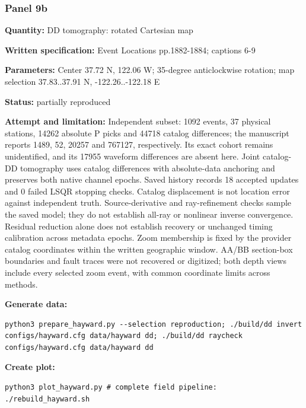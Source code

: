 \subsubsection*{Panel 9b}
\noindent\textbf{Quantity:} DD tomography: rotated Cartesian map\par
\noindent\textbf{Written specification:} Event Locations pp.1882-1884; captions 6-9\par
\noindent\textbf{Parameters:} Center 37.72 N, 122.06 W; 35-degree anticlockwise rotation; map selection 37.83..37.91 N, -122.26..-122.18 E\par
\noindent\textbf{Status:} partially reproduced\par
\noindent\textbf{Attempt and limitation:} Independent subset: 1092 events, 37 physical stations, 14262 absolute P picks and 44718 catalog differences; the manuscript reports 1489, 52, 20257 and 767127, respectively. Its exact cohort remains unidentified, and its 17955 waveform differences are absent here. Joint catalog-DD tomography uses catalog differences with absolute-data anchoring and preserves both native channel epochs. Saved history records 18 accepted updates and 0 failed LSQR stopping checks. Catalog displacement is not location error against independent truth. Source-derivative and ray-refinement checks sample the saved model; they do not establish all-ray or nonlinear inverse convergence. Residual reduction alone does not establish recovery or unchanged timing calibration across metadata epochs. Zoom membership is fixed by the provider catalog coordinates within the written geographic window. AA/BB section-box boundaries and fault traces were not recovered or digitized; both depth views include every selected zoom event, with common coordinate limits across methods.\par
\noindent\textbf{Generate data:}
\begin{lstlisting}
python3 prepare_hayward.py --selection reproduction; ./build/dd invert configs/hayward.cfg data/hayward dd; ./build/dd raycheck configs/hayward.cfg data/hayward dd
\end{lstlisting}
\noindent\textbf{Create plot:}
\begin{lstlisting}
python3 plot_hayward.py # complete field pipeline: ./rebuild_hayward.sh
\end{lstlisting}
